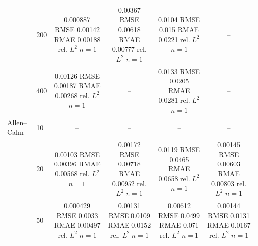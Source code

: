 \begin{tabular}{llcccc}
 & 200 & \shortstack{0.000887 RMSE\\0.00142 RMAE\\0.00188 rel. $L^2$\\$n=1$} & \shortstack{0.00367 RMSE\\0.00618 RMAE\\0.00777 rel. $L^2$\\$n=1$} & \shortstack{0.0104 RMSE\\0.015 RMAE\\0.0221 rel. $L^2$\\$n=1$} & -- \\
 & 400 & \shortstack{0.00126 RMSE\\0.00187 RMAE\\0.00268 rel. $L^2$\\$n=1$} & -- & \shortstack{0.0133 RMSE\\0.0205 RMAE\\0.0281 rel. $L^2$\\$n=1$} & -- \\
\addlinespace
Allen–Cahn & 10 & -- & -- & -- & -- \\
 & 20 & \shortstack{0.00103 RMSE\\0.00396 RMAE\\0.00568 rel. $L^2$\\$n=1$} & \shortstack{0.00172 RMSE\\0.00718 RMAE\\0.00952 rel. $L^2$\\$n=1$} & \shortstack{0.0119 RMSE\\0.0465 RMAE\\0.0658 rel. $L^2$\\$n=1$} & \shortstack{0.00145 RMSE\\0.00603 RMAE\\0.00803 rel. $L^2$\\$n=1$} \\
 & 50 & \shortstack{0.000429 RMSE\\0.0033 RMAE\\0.00497 rel. $L^2$\\$n=1$} & \shortstack{0.00131 RMSE\\0.0109 RMAE\\0.0152 rel. $L^2$\\$n=1$} & \shortstack{0.00612 RMSE\\0.0499 RMAE\\0.071 rel. $L^2$\\$n=1$} & \shortstack{0.00144 RMSE\\0.0131 RMAE\\0.0167 rel. $L^2$\\$n=1$} \\

\end{tabular}
